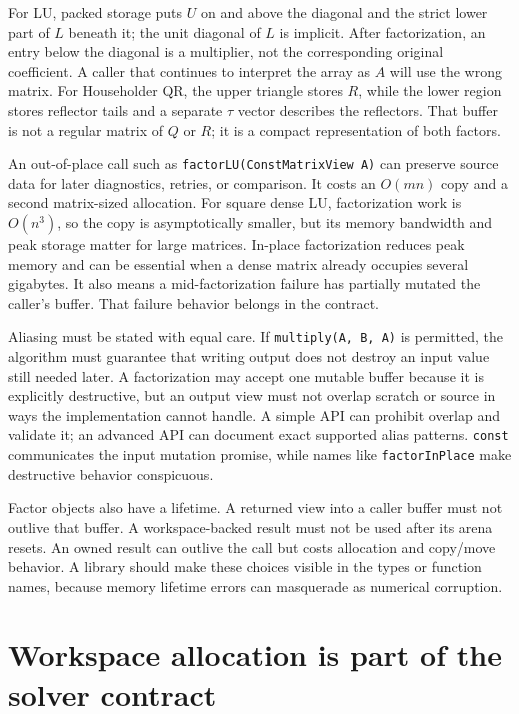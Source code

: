 For LU, packed storage puts \(U\) on and above the diagonal and the strict lower part of \(L\) beneath it; the unit diagonal of \(L\) is implicit. After factorization, an entry below the diagonal is a multiplier, not the corresponding original coefficient. A caller that continues to interpret the array as \(A\) will use the wrong matrix. For Householder QR, the upper triangle stores \(R\), while the lower region stores reflector tails and a separate \(\tau\) vector describes the reflectors. That buffer is not a regular matrix of \(Q\) or \(R\); it is a compact representation of both factors.

An out-of-place call such as \texttt{factorLU(ConstMatrixView\ A)} can preserve source data for later diagnostics, retries, or comparison. It costs an \(O(mn)\) copy and a second matrix-sized allocation. For square dense LU, factorization work is \(O(n^3)\), so the copy is asymptotically smaller, but its memory bandwidth and peak storage matter for large matrices. In-place factorization reduces peak memory and can be essential when a dense matrix already occupies several gigabytes. It also means a mid-factorization failure has partially mutated the caller's buffer. That failure behavior belongs in the contract.

Aliasing must be stated with equal care. If \texttt{multiply(A,\ B,\ A)} is permitted, the algorithm must guarantee that writing output does not destroy an input value still needed later. A factorization may accept one mutable buffer because it is explicitly destructive, but an output view must not overlap scratch or source in ways the implementation cannot handle. A simple API can prohibit overlap and validate it; an advanced API can document exact supported alias patterns. \texttt{const} communicates the input mutation promise, while names like \texttt{factorInPlace} make destructive behavior conspicuous.

Factor objects also have a lifetime. A returned view into a caller buffer must not outlive that buffer. A workspace-backed result must not be used after its arena resets. An owned result can outlive the call but costs allocation and copy/move behavior. A library should make these choices visible in the types or function names, because memory lifetime errors can masquerade as numerical corruption.

\section{Workspace allocation is part of the solver contract}\label{02-foundations-ii-ch038-workspace-allocation-is-part-of-the-solver-contract}

